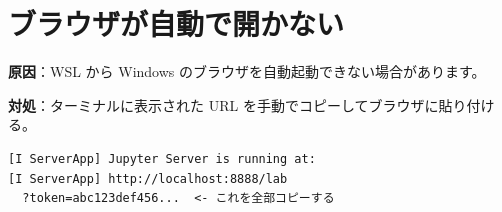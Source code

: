 \section{ブラウザが自動で開かない}

\textbf{原因}：WSL から Windows のブラウザを自動起動できない場合があります。

\textbf{対処}：ターミナルに表示された URL を手動でコピーしてブラウザに貼り付ける。

\begin{wslbox}
\begin{lstlisting}[style=bash]
[I ServerApp] Jupyter Server is running at:
[I ServerApp] http://localhost:8888/lab
  ?token=abc123def456...  <- これを全部コピーする
\end{lstlisting}
\end{wslbox}
